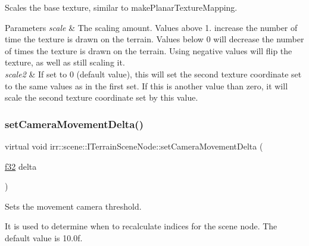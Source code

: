 Scales the base texture, similar to make\+Planar\+Texture\+Mapping. 


\begin{DoxyParams}{Parameters}
{\em scale} & The scaling amount. Values above 1. increase the number of time the texture is drawn on the terrain. Values below 0 will decrease the number of times the texture is drawn on the terrain. Using negative values will flip the texture, as well as still scaling it. \\
\hline
{\em scale2} & If set to 0 (default value), this will set the second texture coordinate set to the same values as in the first set. If this is another value than zero, it will scale the second texture coordinate set by this value. \\
\hline
\end{DoxyParams}
\mbox{\label{classirr_1_1scene_1_1ITerrainSceneNode_af2c07f67c1c5319de4a796ec57950ec3}} 
\subsubsection{\texorpdfstring{set\+Camera\+Movement\+Delta()}{setCameraMovementDelta()}\hspace{0.1cm}{\footnotesize\ttfamily [1/2]}}
{\footnotesize\ttfamily virtual void irr\+::scene\+::\+I\+Terrain\+Scene\+Node\+::set\+Camera\+Movement\+Delta (\begin{DoxyParamCaption}\item[{\hyperlink{namespaceirr_a0277be98d67dc26ff93b1a6a1d086b07}{f32}}]{delta }\end{DoxyParamCaption})\hspace{0.3cm}{\ttfamily [pure virtual]}}



Sets the movement camera threshold. 

It is used to determine when to recalculate indices for the scene node. The default value is 10.\+0f. \mbox{\label{classirr_1_1scene_1_1ITerrainSceneNode_af2c07f67c1c5319de4a796ec57950ec3}} 
